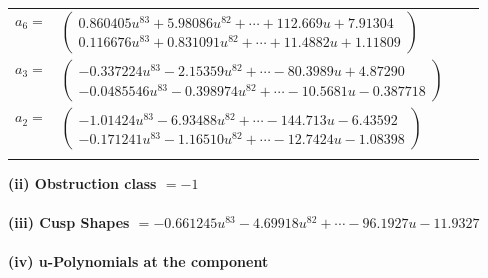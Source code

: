 \documentclass[1p]{elsarticle_modified}
\theoremstyle{definition}
\begin{document}
\begin{tabular}{m{7pt} m{180pt} m{7pt} m{180pt} }
\flushright $a_{6}=$&$\begin{pmatrix}0.860405 u^{83}+5.98086 u^{82}+\cdots+112.669 u+7.91304\\0.116676 u^{83}+0.831091 u^{82}+\cdots+11.4882 u+1.11809\end{pmatrix}$ \\
\flushright $a_{3}=$&$\begin{pmatrix}-0.337224 u^{83}-2.15359 u^{82}+\cdots-80.3989 u+4.87290\\-0.0485546 u^{83}-0.398974 u^{82}+\cdots-10.5681 u-0.387718\end{pmatrix}$ \\
\flushright $a_{2}=$&$\begin{pmatrix}-1.01424 u^{83}-6.93488 u^{82}+\cdots-144.713 u-6.43592\\-0.171241 u^{83}-1.16510 u^{82}+\cdots-12.7424 u-1.08398\end{pmatrix}$\\&\end{tabular}
\flushleft \textbf{(ii) Obstruction class $= -1$}\\~\\
\flushleft \textbf{(iii) Cusp Shapes $= -0.661245 u^{83}-4.69918 u^{82}+\cdots-96.1927 u-11.9327$}\\~\\
\newpage\renewcommand{\arraystretch}{1}
\flushleft \textbf{(iv) u-Polynomials at the component}\newline \\
\end{document}

